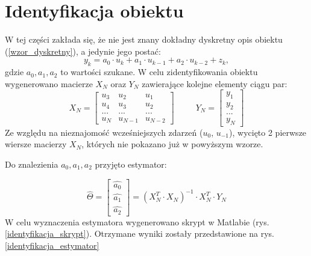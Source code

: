 \documentclass[12pt]{article}
\begin{document}
\section{Identyfikacja obiektu}
W tej części zakłada się, że nie jest znany dokładny dyskretny opis obiektu (\ref{wzor_dyskretny}), a jedynie jego postać:
\begin{equation}
    y_k = a_0 \cdot u_k+a_1 \cdot u_{k-1} + a_2 \cdot u_{k-2} + z_k,
\end{equation}
gdzie $a_0, a_1, a_2$ to wartości szukane. W celu zidentyfikowania obiektu wygenerowano macierze $X_N$ oraz $Y_N$ zawierające kolejne elementy ciągu par:
\begin{equation}
    X_N = \begin{bmatrix}
        u_3 & u_2 & u_1\\
        u_4 & u_3 & u_2\\
        ... & ... & ... \\
        u_N & u_{N-1} & u_{N-2}
        \end{bmatrix}
    \hspace{30pt}
    Y_N = \begin{bmatrix}
        y_1\\
        y_2\\
        ...\\
        y_N
    \end{bmatrix}
\end{equation}
Ze względu na nieznajomość wcześniejszych zdarzeń ($u_0$, $u_{-1}$), wycięto 2 pierwsze wiersze macierzy $X_N$, których nie pokazano już w powyższym wzorze.

Do znalezienia $a_0, a_1, a_2$ przyjęto estymator:

\begin{equation}
    \hat{\varTheta} = \begin{bmatrix}
        \hat{a_0}\\
        \hat{a_1}\\
        \hat{a_2}
    \end{bmatrix} 
    = {(X_N^T \cdot X_N)}^{-1} \cdot X_N^T \cdot Y_N
\end{equation}
W celu wyznaczenia estymatora wygenerowano skrypt w Matlabie (rys. \ref{identyfikacja_skrypt}). Otrzymane wyniki zostały przedstawione na rys. \ref{identyfikacja_estymator}
\end{document}
